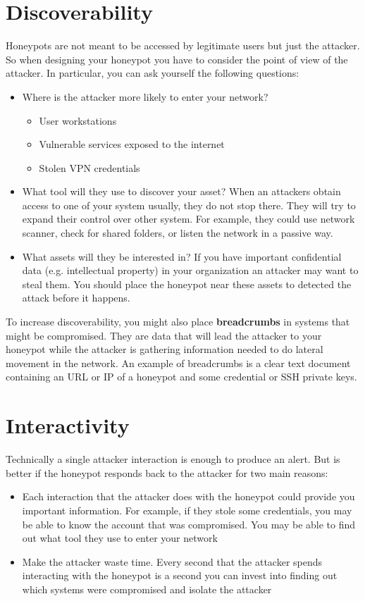 \documentclass[epsfig,a4paper,11pt,titlepage,oneside,openany]{book}
\begin{document}
\section{Discoverability}
Honeypots are not meant to be accessed by legitimate users but just the attacker. So when designing your honeypot you have to consider the point of view of the attacker.
In particular, you can ask yourself the following questions:
\begin{itemize}
\item Where is the attacker more likely to enter your network?
	\begin{itemize}
	\item User workstations
	\item Vulnerable services exposed to the internet
	\item Stolen VPN credentials
	\end{itemize}
\item What tool will they use to discover your asset?
When an attackers obtain access to one of your system usually, they do not stop there. They will try to expand their control over other system. For example, they could use network scanner, check for shared folders, or listen the network in a passive way.
\item What assets will they be interested in?
If you have important confidential data (e.g. intellectual property) in your organization an attacker may want to steal them. You should place the honeypot near these assets to detected the attack before it happens. 
\end{itemize}

To increase discoverability, you might also place \textbf{breadcrumbs} in systems that might be compromised. They are data that will lead the attacker to your honeypot while the attacker is gathering information needed to do lateral movement in the network. An example of breadcrumbs is a clear text document containing an URL or IP of a honeypot and some credential or SSH private keys.

\section{Interactivity}

Technically a single attacker interaction is enough to produce an alert. But is better if the honeypot responds back to the attacker for two main reasons:
\begin{itemize}
\item Each interaction that the attacker does with the honeypot could provide you important information. For example, if they stole some credentials, you may be able to know the account that was compromised. You may be able to find out what tool they use to enter  your network
\item Make the attacker waste time. Every second that the attacker spends interacting with the honeypot is a second you can invest into finding out which systems were compromised and isolate the attacker
\end{itemize}
\end{document}
